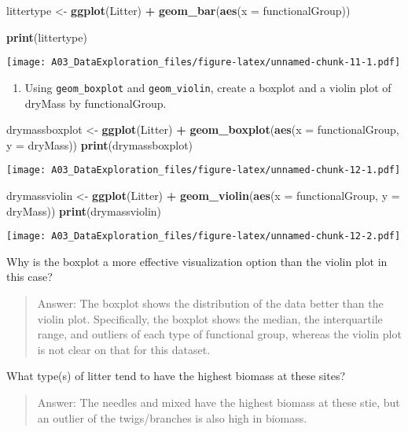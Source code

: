 \documentclass[]{article}
\newenvironment{Shaded}{\begin{snugshade}}{\end{snugshade}}
\newcommand{\DataTypeTok}[1]{\textcolor[rgb]{0.13,0.29,0.53}{#1}}
\newcommand{\KeywordTok}[1]{\textcolor[rgb]{0.13,0.29,0.53}{\textbf{#1}}}
\newcommand{\NormalTok}[1]{#1}
\newcommand{\OperatorTok}[1]{\textcolor[rgb]{0.81,0.36,0.00}{\textbf{#1}}}
\newcommand{\StringTok}[1]{\textcolor[rgb]{0.31,0.60,0.02}{#1}}
\providecommand{\tightlist}{%
  \setlength{\itemsep}{0pt}\setlength{\parskip}{0pt}}
\begin{document}
\begin{Shaded}
\begin{Highlighting}[]
\NormalTok{littertype <-}\StringTok{ }\KeywordTok{ggplot}\NormalTok{(Litter) }\OperatorTok{+}
\StringTok{  }\KeywordTok{geom_bar}\NormalTok{(}\KeywordTok{aes}\NormalTok{(}\DataTypeTok{x =}\NormalTok{ functionalGroup))}

\KeywordTok{print}\NormalTok{(littertype)}
\end{Highlighting}
\end{Shaded}

\texttt{[image: A03\_DataExploration\_files/figure-latex/unnamed-chunk-11-1.pdf]}

\begin{enumerate}
\def\labelenumi{\arabic{enumi}.}
\setcounter{enumi}{14}
\tightlist
\item
  Using \texttt{geom\_boxplot} and \texttt{geom\_violin}, create a
  boxplot and a violin plot of dryMass by functionalGroup.
\end{enumerate}

\begin{Shaded}
\begin{Highlighting}[]
\NormalTok{drymassboxplot <-}\StringTok{ }\KeywordTok{ggplot}\NormalTok{(Litter) }\OperatorTok{+}
\StringTok{  }\KeywordTok{geom_boxplot}\NormalTok{(}\KeywordTok{aes}\NormalTok{(}\DataTypeTok{x =}\NormalTok{ functionalGroup, }\DataTypeTok{y =}\NormalTok{ dryMass))}
\KeywordTok{print}\NormalTok{(drymassboxplot)}
\end{Highlighting}
\end{Shaded}

\texttt{[image: A03\_DataExploration\_files/figure-latex/unnamed-chunk-12-1.pdf]}

\begin{Shaded}
\begin{Highlighting}[]
\NormalTok{drymassviolin <-}\StringTok{ }\KeywordTok{ggplot}\NormalTok{(Litter) }\OperatorTok{+}
\StringTok{  }\KeywordTok{geom_violin}\NormalTok{(}\KeywordTok{aes}\NormalTok{(}\DataTypeTok{x =}\NormalTok{ functionalGroup, }\DataTypeTok{y =}\NormalTok{ dryMass))}
\KeywordTok{print}\NormalTok{(drymassviolin)}
\end{Highlighting}
\end{Shaded}

\texttt{[image: A03\_DataExploration\_files/figure-latex/unnamed-chunk-12-2.pdf]}

Why is the boxplot a more effective visualization option than the violin
plot in this case?

\begin{quote}
Answer: The boxplot shows the distribution of the data better than the
violin plot. Specifically, the boxplot shows the median, the
interquartile range, and outliers of each type of functional group,
whereas the violin plot is not clear on that for this dataset.
\end{quote}

What type(s) of litter tend to have the highest biomass at these sites?

\begin{quote}
Answer: The needles and mixed have the highest biomass at these stie,
but an outlier of the twigs/branches is also high in biomass.
\end{quote}
\end{document}
